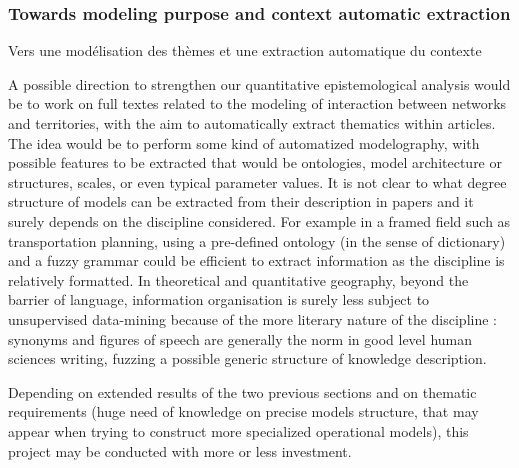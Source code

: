 



\subsubsection{Towards modeling purpose and context automatic extraction}{Vers une modélisation des thèmes et une extraction automatique du contexte}


A possible direction to strengthen our quantitative epistemological analysis would be to work on full textes related to the modeling of interaction between networks and territories, with the aim to automatically extract thematics within articles. The idea would be to perform some kind of automatized modelography, with possible features to be extracted that would be ontologies, model architecture or structures, scales, or even typical parameter values. It is not clear to what degree structure of models can be extracted from their description in papers and it surely depends on the discipline considered. For example in a framed field such as transportation planning, using a pre-defined ontology (in the sense of dictionary) and a fuzzy grammar could be efficient to extract information as the discipline is relatively formatted. In theoretical and quantitative geography, beyond the barrier of language, information organisation is surely less subject to unsupervised data-mining because of the more literary nature of the discipline : synonyms and figures of speech are generally the norm in good level human sciences writing, fuzzing a possible generic structure of knowledge description. 

Depending on extended results of the two previous sections and on thematic requirements (huge need of knowledge on precise models structure, that may appear when trying to construct more specialized operational models), this project may be conducted with more or less investment.







